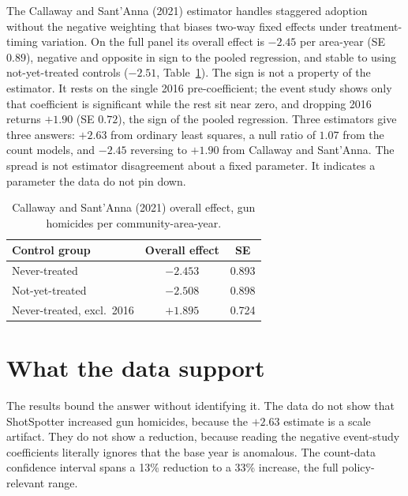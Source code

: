 \documentclass[12pt]{article}
\begin{document}
The Callaway and Sant'Anna (2021) estimator handles staggered adoption without the
negative weighting that biases two-way fixed effects under treatment-timing variation. On
the full panel its overall effect is $-2.45$ per area-year (SE $0.89$), negative and
opposite in sign to the pooled regression, and stable to using not-yet-treated controls
($-2.51$, Table~\ref{tab:cs}). The sign is not a property of the estimator. It rests on
the single 2016 pre-coefficient; the event study shows only that coefficient is
significant while the rest sit near zero, and dropping 2016 returns $+1.90$ (SE $0.72$),
the sign of the pooled regression. Three estimators give three answers: $+2.63$ from
ordinary least squares, a null ratio of $1.07$ from the count models, and $-2.45$
reversing to $+1.90$ from Callaway and Sant'Anna. The spread is not estimator disagreement
about a fixed parameter. It indicates a parameter the data do not pin down.

\begin{table}[H]
\centering
\small
\caption{Callaway and Sant'Anna (2021) overall effect, gun homicides per
community-area-year.}
\label{tab:cs}
\begin{tabular}{lcc}
\toprule
Control group & Overall effect & SE \\
\midrule
Never-treated                 & $-2.453$ & 0.893 \\
Not-yet-treated               & $-2.508$ & 0.898 \\
Never-treated, excl.\ 2016    & $+1.895$ & 0.724 \\
\bottomrule
\end{tabular}
\end{table}

\section{What the data support}

The results bound the answer without identifying it. The data do not show that ShotSpotter
increased gun homicides, because the $+2.63$ estimate is a scale artifact. They do not show
a reduction, because reading the negative event-study coefficients literally ignores that
the base year is anomalous. The count-data confidence interval spans a 13\% reduction to a
33\% increase, the full policy-relevant range.
\end{document}
